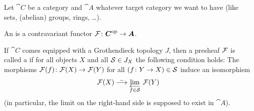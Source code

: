 \documentclass[a4paper,parskip=half,numbers=enddot, DIV=12]{scrreprt}
\begin{document}
\begin{defi}
	Let $\cat C$ be a category and $\cat A$ whatever target category we want to have (like sets, (abelian) groups, rings, \ldots).
	\begin{alphanumerate}
		\item An  is a contravariant functor $\Ff\colon \cat C^\op\morphism\cat A$. 
		\item If $\cat C$ comes equipped with a Grothendieck topology $J$, then a presheaf $\mathcal{F}$ is called a  if for all objects $X$ and all $\mathcal{S}\in J_X$ the following condition holds: The morphisms $\Ff(f)\colon\Ff(X)\morphism\Ff(Y)$ for all $(f\colon Y\morphism X)\in\Ss$ induce an isomorphism
		\begin{align}\lbl{eq:sheafAxiom}
		\Ff(X)\isomorphism \limit[f\in\Ss]\Ff(Y)
		\end{align}%
		(in particular, the limit on the right-hand side is supposed to exist in $\cat A$).
		
	\end{alphanumerate}
	\end{defi}
\end{document}

